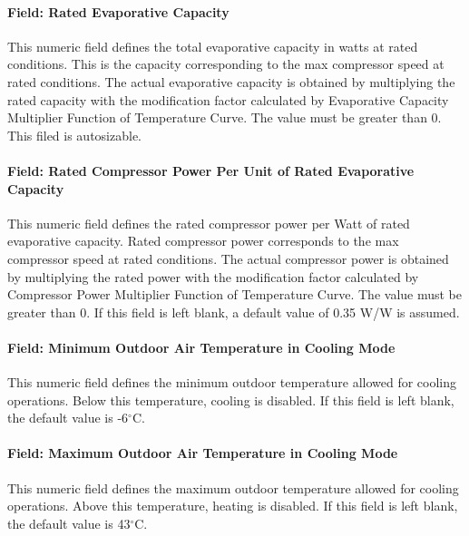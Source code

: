 \paragraph{Field: Rated Evaporative Capacity}\label{field-rated-evaporative-capacity}

This numeric field defines the total evaporative capacity in watts at rated conditions. This is the capacity corresponding to the max compressor speed at rated conditions. The actual evaporative capacity is obtained by multiplying the rated capacity with the modification factor calculated by Evaporative Capacity Multiplier Function of Temperature Curve. The value must be greater than 0. This filed is autosizable.

\paragraph{Field: Rated Compressor Power Per Unit of Rated Evaporative Capacity}\label{field-rated-compressor-power-per-unit-of-rated-evaporative-capacity}

This numeric field defines the rated compressor power per Watt of rated evaporative capacity. Rated compressor power corresponds to the max compressor speed at rated conditions. The actual compressor power is obtained by multiplying the rated power with the modification factor calculated by Compressor Power Multiplier Function of Temperature Curve. The value must be greater than 0. If this field is left blank, a default value of 0.35 W/W is assumed.

\paragraph{Field: Minimum Outdoor Air Temperature in Cooling Mode}\label{field-minimum-outdoor-air-temperature-in-cooling-mode}

This numeric field defines the minimum outdoor temperature allowed for cooling operations. Below this temperature, cooling is disabled. If this field is left blank, the default value is -6$^\circ$C.

\paragraph{Field: Maximum Outdoor Air Temperature in Cooling Mode}\label{field-maximum-outdoor-air-temperature-in-cooling-mode}

This numeric field defines the maximum outdoor temperature allowed for cooling operations. Above this temperature, heating is disabled. If this field is left blank, the default value is 43$^\circ$C.


